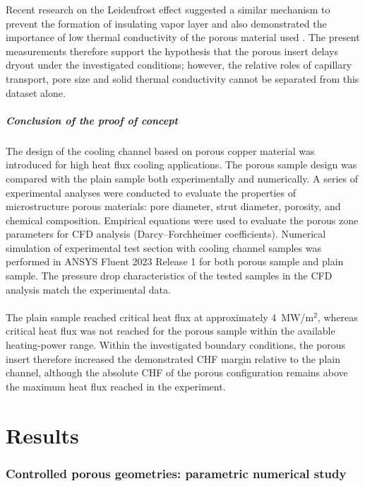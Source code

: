 \documentclass[a4paper]{article}
\begin{document}
Recent research on the Leidenfrost effect suggested a similar mechanism to prevent the formation of insulating vapor layer and also demonstrated the importance of low thermal conductivity of the porous material used \cite{Jiang2022}.
The present measurements therefore support the hypothesis that the porous insert delays dryout under the investigated conditions; however, the relative roles of capillary transport, pore size and solid thermal conductivity cannot be separated from this dataset alone.

\subsubsection{Conclusion of the proof of concept}
The design of the cooling channel based on porous copper material was introduced for high heat flux cooling applications.
The porous sample design was compared with the plain sample both experimentally and numerically.
A series of experimental analyses were conducted to evaluate the properties of microstructure porous materials: pore diameter, strut diameter, porosity, and chemical composition.
Empirical equations were used to evaluate the porous zone parameters for CFD analysis (Darcy--Forchheimer coefficients).
Numerical simulation of experimental test section with cooling channel samples was performed in ANSYS Fluent 2023 Release 1 for both porous sample and plain sample.
The pressure drop characteristics of the tested samples in the CFD analysis match the experimental data.
\\
\\

The plain sample reached critical heat flux at approximately 4~MW/m$^2$, whereas critical heat flux was not reached for the porous sample within the available heating-power range.
Within the investigated boundary conditions, the porous insert therefore increased the demonstrated CHF margin relative to the plain channel, although the absolute CHF of the porous configuration remains above the maximum heat flux reached in the experiment.

\pagebreak
\part{Results}



\section{Controlled porous geometries: parametric numerical study}
\end{document}
